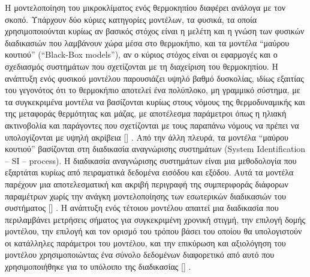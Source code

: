 \documentclass[12pt, a4paper]{report} %
\DeclareRobustCommand{\lcitep}[1]{%
  \english{[\cite{#1}]}%
}
\newcommand{\english}{\foreignlanguage{english}}
\begin{document}
Η μοντελοποίηση του μικροκλίματος ενός θερμοκηπίου διαφέρει ανάλογα με τον σκοπό. Υπάρχουν δύο κύριες κατηγορίες μοντέλων, 
τα φυσικά, τα οποία χρησιμοποιούνται κυρίως αν βασικός στόχος είναι η μελέτη και η γνώση των φυσικών διαδικασιών που 
λαμβάνουν χώρα μέσα στο θερμοκήπιο, και τα μοντέλα “μαύρου κουτιού” (“\english{Black-Box models}”), αν ο κύριος στόχος 
είναι οι εφαρμογές και ο σχεδιασμός συστημάτων που σχετίζονται με τη διαχείριση του θερμοκηπίου. Η ανάπτυξη ενός φυσικού 
μοντέλου παρουσιάζει υψηλό βαθμό δυσκολίας, ιδίως εξαιτίας του γεγονότος ότι το θερμοκήπιο αποτελεί ένα πολύπλοκο, μη 
γραμμικό σύστημα, με τα συγκεκριμένα μοντέλα να βασίζονται κυρίως στους νόμους της θερμοδυναμικής και της μεταφοράς 
θερμότητας και μάζας, με αποτέλεσμα παράμετροι όπως η ηλιακή ακτινοβολία και παράγοντες που σχετίζονται με τους παραπάνω 
νόμους να πρέπει να υπολογίζονται με υψηλή ακρίβεια \lcitep{neural_bib5,neural_bib6,neural_bib7}. Από την άλλη πλευρά, τα 
μοντέλα “μαύρου κουτιού” βασίζονται στη διαδικασία αναγνώρισης συστημάτων (\english{System Identification – SI – process}). 
H διαδικασία αναγνώρισης συστημάτων είναι μια μεθοδολογία που εξαρτάται κυρίως από πειραματικά δεδομένα εισόδου και εξόδου. 
Αυτά τα μοντέλα παρέχουν μια αποτελεσματική και ακριβή περιγραφή της συμπεριφοράς διάφορων παραμέτρων χωρίς την ανάγκη 
μοντελοποίησης των εσωτερικών διαδικασιών του συστήματος \lcitep{neural_bib8}. Η ανάπτυξη ενός τέτοιου μοντέλου απαιτεί 
μια διαδικασία που περιλαμβάνει μετρήσεις σήματος για συγκεκριμένη χρονική στιγμή, την επιλογή δομής μοντέλου, την επιλογή 
και τον ορισμό του τρόπου βάσει του οποίου θα υπολογιστούν οι κατάλληλες παράμετροι του μοντέλου, και την επικύρωση και 
αξιολόγηση του μοντέλου χρησιμοποιώντας ένα σύνολο δεδομένων διαφορετικό από αυτό που χρησιμοποιήθηκε για το υπόλοιπο της 
διαδικασίας \lcitep{neural_bib9}.
\end{document}
